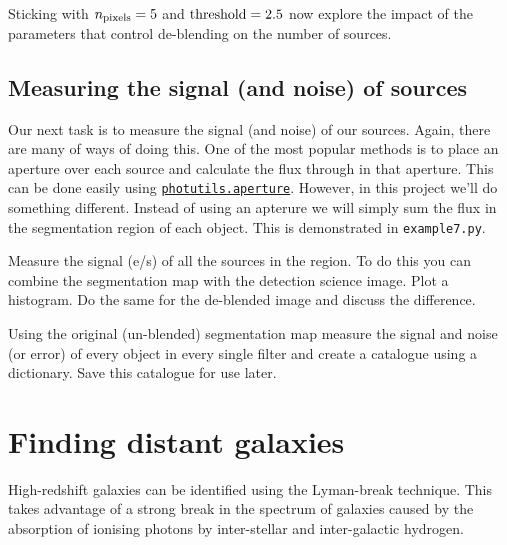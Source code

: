 \documentclass{article}
\begin{document}
\begin{question}
Sticking with $n_{\rm pixels} = 5$ and ${\rm threshold} = 2.5$ now explore the impact of the parameters that control de-blending on the number of sources.
\end{question}


\subsection{Measuring the signal (and noise) of sources}


Our next task is to measure the signal (and noise) of our sources. Again, there are many of ways of doing this. One of the most popular methods is to place an aperture over each source and calculate the flux through in that aperture. This can be done easily using \href{https://photutils.readthedocs.io/en/stable/aperture.html}{\texttt{photutils.aperture}}. However, in this project we'll do something different. Instead of using an apterure we will simply sum the flux in the segmentation region of each object. This is demonstrated in \texttt{example7.py}.

\begin{question}
Measure the signal (e/s) of all the sources in the region. To do this you can combine the segmentation map with the detection science image. Plot a histogram. Do the same for the de-blended image and discuss the difference.
\end{question}

\begin{question}
Using the original (un-blended) segmentation map measure the signal and noise (or error) of every object in every single filter and create a catalogue using a dictionary. Save this catalogue for use later.
\end{question}




\setcounter{Question}{0}
\section{Finding distant galaxies}

High-redshift galaxies can be identified using the Lyman-break technique. This takes advantage of a strong break in the spectrum of galaxies caused by the absorption of ionising photons by inter-stellar and inter-galactic hydrogen.
\end{document}
